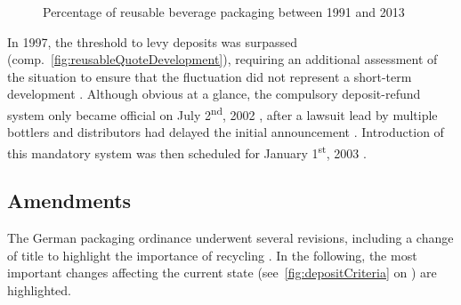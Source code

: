 \begin{figure}[hbt]
	\centering
  	\caption[Percentage of reusable beverage packaging]{Percentage of reusable beverage packaging between 1991 and 2013 \cite{BMU2015} }
  	\label{fig:reusableQuoteDevelopment}
\end{figure}
\FloatBarrier


In 1997, the threshold to levy deposits was surpassed (comp.~\autoref{fig:reusableQuoteDevelopment}), requiring an additional assessment of the situation to ensure that the fluctuation did not represent a short-term development \cite[§ 9]{verpackV1991} \cite[p.~5]{Hartlep2011Recycling}. Although obvious at a glance, the compulsory deposit-refund system only became official on July 2\textsuperscript{nd}, 2002 \cite[p.~49]{Geyer/Smoltczyk2003}, after a lawsuit lead by multiple bottlers and distributors had delayed the initial announcement \cite{spon2011handel}. Introduction of this mandatory system was then scheduled for January 1\textsuperscript{st}, 2003 \cite[p.~53]{Geyer/Smoltczyk2003}.

\subsection{Amendments}
The German packaging ordinance underwent several revisions, including a change of title to highlight the importance of recycling \cite{verpackV1998}. In the following, the most important changes affecting the current state (see~\autoref{fig:depositCriteria} on ) are highlighted.

